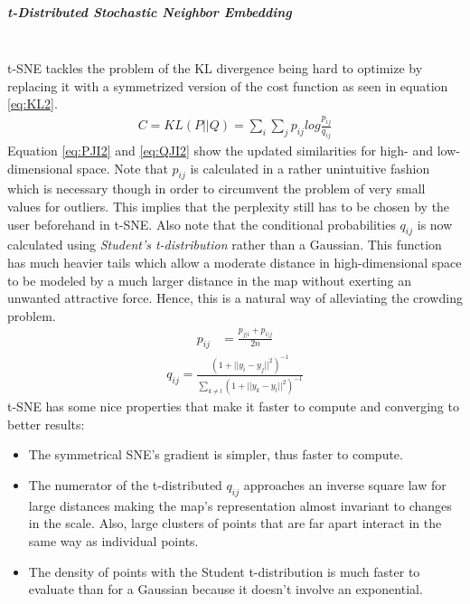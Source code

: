 \subparagraph{t-Distributed Stochastic Neighbor Embedding}\mbox{}\\
t-SNE tackles the problem of the KL divergence being hard to optimize by replacing it with a symmetrized version of the cost function as seen in equation \ref{eq:KL2}.
\begin{align}
\label{eq:KL2}
C=KL(P||Q)=\sum_i \sum_j p_{ij} log\frac{p_{ij}}{q_{ij}}
\end{align}
Equation \ref{eq:PJI2} and \ref{eq:QJI2} show the updated similarities for high- and low-dimensional space. Note that $p_{ij}$ is calculated in a rather unintuitive fashion which is necessary though in order to circumvent the problem of very small values for outliers. This implies that the perplexity still has to be chosen by the user beforehand in t-SNE. Also note that the conditional probabilities $q_{ij}$ is now calculated using \textit{Student's t-distribution} rather than a Gaussian. This function has much heavier tails which allow a moderate distance in high-dimensional space to be modeled by a much larger distance in the map without exerting an unwanted attractive force. Hence, this is a natural way of alleviating the crowding problem.  
\begin{align}
\label{eq:PJI2}
p_{ij} &=\frac{p_{j|i}+p_{i|j}}{2n}
\end{align}
\begin{align}
\label{eq:QJI2}
q_{ij}=\frac{(1+||y_i-y_j||^2)^{-1}}{\sum_{k\neq l} (1+||y_k-y_l||^2)^{-1}}
\end{align}
t-SNE has some nice properties that make it faster to compute and converging to better results:
\begin{itemize}
\item The symmetrical SNE's gradient is simpler, thus faster to compute.
\item The numerator of the t-distributed $q_{ij}$ approaches an inverse square law for large distances making the map's representation almost invariant to changes in the scale. Also, large clusters of points that are far apart interact in the same way as individual points.
\item The density of points with the Student t-distribution is much faster to evaluate than for a Gaussian because it doesn't involve an exponential. 
\end{itemize}

